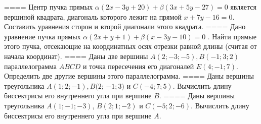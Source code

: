====
Центр пучка прямых \(\alpha(2x - 3y + 20) + \beta(3x + 5y - 27) = 0\) является вершиной квадрата, диагональ которого лежит на прямой \(x + 7y - 16 = 0\). Составить уравнения сторон и второй диагонали этого квадрата.
====
Дано уравнение пучка прямых \(\alpha(2x + y + 1) + \beta(x - 3y - 10) = 0\) . Найти прямые этого пучка, отсекающие на координатных осях отрезки равной длины (считая от начала координат).
====
Даны две вершины \(A(2; - 3; - 5),B( - 1;3;2)\) параллелограмма \(ABCD\) и точка пересечения его диагоналей \(E(4; - 1;7)\). Определить две другие вершины этого параллелограмма.
====
Даны вершины треугольника \(A(1;2; - 1),B(2\); \(- 1;3)\) и \(C( - 4;7;5)\). Вычислить длину биссектрисы его внутреннего угла при вершине \(B\).
====
Даны вершины треугольника \(A(1; - 1; - 3)\), \(B(2;1; - 2)\) и \(C( - 5;2; - 6)\). Вычислить длину биссектрисы его внутреннего угла при вершине \(A\).